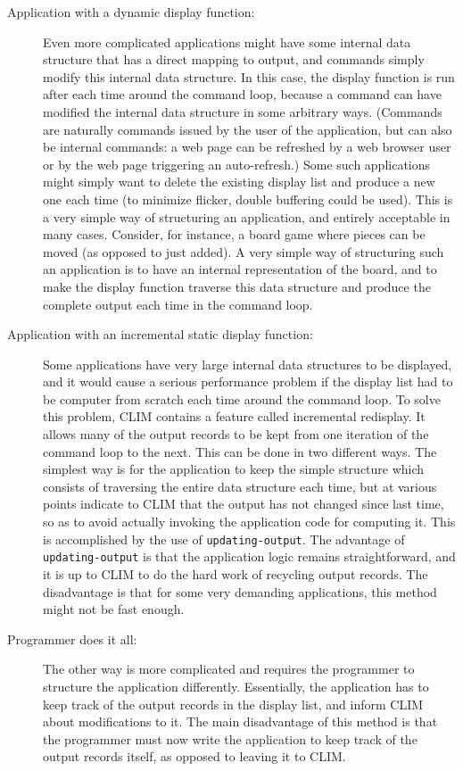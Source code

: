 \begin{description}
  \item[Application with a dynamic display function:] Even more
    complicated applications might have some internal data structure
    that has a direct mapping to output, and commands simply modify
    this internal data structure.  In this case, the display function
    is run after each time around the command loop, because a command
    can have modified the internal data structure in some arbitrary
    ways.  (Commands are naturally commands issued by the user of the
    application, but can also be internal commands: a web page can be
    refreshed by a web browser user or by the web page triggering an
    auto-refresh.) Some such applications might simply want to delete
    the existing display list and produce a new one each time (to
    minimize flicker, double buffering could be used).  This is a very
    simple way of structuring an application, and entirely acceptable
    in many cases.  Consider, for instance, a board game where pieces
    can be moved (as opposed to just added).  A very simple way of
    structuring such an application is to have an internal
    representation of the board, and to make the display function
    traverse this data structure and produce the complete output each
    time in the command loop.

  \item[Application with an incremental static display function:] Some
    applications have very large internal data structures to be
    displayed, and it would cause a serious performance problem if the
    display list had to be computer from scratch each time around the
    command loop.  To solve this problem, CLIM contains a feature
    called incremental redisplay.  It allows many of the output
    records to be kept from one iteration of the command loop to the
    next.  This can be done in two different ways.  The simplest way
    is for the application to keep the simple structure which consists
    of traversing the entire data structure each time, but at various
    points indicate to CLIM that the output has not changed since last
    time, so as to avoid actually invoking the application code for
    computing it.  This is accomplished by the use of
    \texttt{updating-output}.  The advantage of
    \texttt{updating-output} is that the application logic remains
    straightforward, and it is up to CLIM to do the hard work of
    recycling output records.  The disadvantage is that for some very
    demanding applications, this method might not be fast enough.

  \item[Programmer does it all:] The other way is more complicated and
    requires the programmer to structure the application differently.
    Essentially, the application has to keep track of the output
    records in the display list, and inform CLIM about modifications
    to it.  The main disadvantage of this method is that the
    programmer must now write the application to keep track of the
    output records itself, as opposed to leaving it to CLIM.

\end{description}

